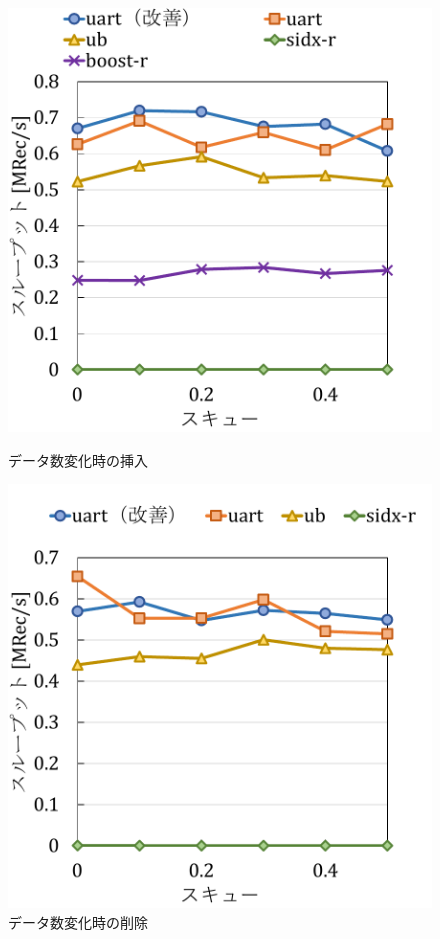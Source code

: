\begin{figure}[tb]
  \begin{minipage}[c]{0.495\textwidth}
    \centering
    \includegraphics[scale=0.5]{./figures/graph-skew-update-2.pdf}
    \caption{データ数変化時の挿入}
    \label{graph:grouped}
  \end{minipage}
  \begin{minipage}[c]{0.495\textwidth}
    \centering
    \includegraphics[scale=0.5]{./figures/graph-skew-update-8.pdf}
    \caption{データ数変化時の削除}
    \label{graph:paired}
  \end{minipage}
\end{figure}

